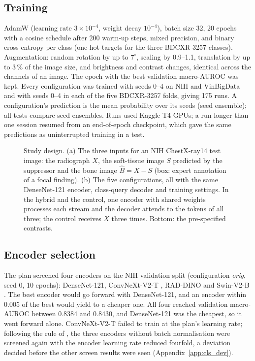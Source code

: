 \subsection{Training}
AdamW \citep{loshchilov2019adamw} (learning rate $3\times10^{-4}$, weight decay $10^{-4}$), batch size 32, 20 epochs with a cosine schedule
after 200 warm-up steps, mixed precision, and binary cross-entropy per class (one-hot targets for the three BDCXR-3257 classes). Augmentation:
random rotation by up to $7^\circ$, scaling by 0.9--1.1, translation by up to 3\,\% of the image size, and brightness and contrast changes,
identical across the channels of an image. The epoch with the best validation macro-AUROC was kept. Every configuration was trained with
seeds 0--4 on NIH and VinBigData and with seeds 0--4 in each of the five BDCXR-3257 folds, giving 175 runs. A configuration's prediction is
the mean probability over its seeds (seed ensemble); all tests compare seed ensembles. Runs used Kaggle T4 GPUs; a run longer than one
session resumed from an end-of-epoch checkpoint, which gave the same predictions as uninterrupted training in a test.

\begin{figure}[htbp]
\centering
{}
\caption{Study design. (a) The three inputs for an NIH ChestX-ray14 test image: the radiograph $X$, the soft-tissue image $S$ predicted by
the suppressor and the bone image $\hat B=X-S$ (box: expert annotation of a focal finding). (b) The five configurations, all with the same
DenseNet-121 encoder, class-query decoder and training settings. In the hybrid and the control, one encoder with shared weights processes
each stream and the decoder attends to the tokens of all three; the control receives $X$ three times. Bottom: the pre-specified contrasts.}
\label{fig:cls_design}
\end{figure}

\subsection{Encoder selection}
The plan screened four encoders on the NIH validation split (configuration \emph{orig}, seed 0, 10 epochs): DenseNet-121, ConvNeXt-V2-T
\citep{woo2023convnextv2}, RAD-DINO \citep{perezgarcia2025raddino} and Swin-V2-B \citep{liu2022swinv2}. The best encoder would go forward with
DenseNet-121, and an encoder within 0.005 of the best would yield to a cheaper one. All four reached validation macro-AUROC between 0.8384 and
0.8430, and DenseNet-121 was the cheapest, so it went forward alone. ConvNeXt-V2-T failed to train at the plan's learning rate; following the
rule of , the three encoders without batch normalisation were screened again with the encoder learning rate reduced
fourfold, a deviation decided before the other screen results were seen (Appendix~\ref{app:cls_dev}).

